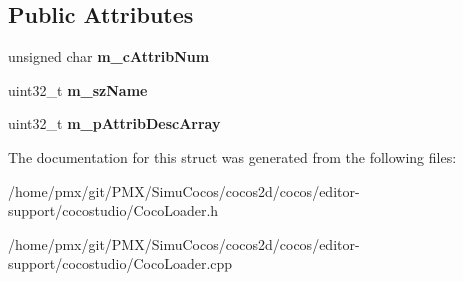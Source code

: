\subsection*{Public Attributes}
\begin{DoxyCompactItemize}
\item 
\mbox{\label{structcocostudio_1_1stExpCocoObjectDesc_af6dedd001344b6002b43b1380414cc0a}} 
unsigned char {\bfseries m\+\_\+c\+Attrib\+Num}
\item 
\mbox{\label{structcocostudio_1_1stExpCocoObjectDesc_a1d7d54a44a2aaad55befc59e32921082}} 
uint32\+\_\+t {\bfseries m\+\_\+sz\+Name}
\item 
\mbox{\label{structcocostudio_1_1stExpCocoObjectDesc_a9a1c251ffc6fba95077d15299bd07719}} 
uint32\+\_\+t {\bfseries m\+\_\+p\+Attrib\+Desc\+Array}
\end{DoxyCompactItemize}


The documentation for this struct was generated from the following files\+:\begin{DoxyCompactItemize}
\item 
/home/pmx/git/\+P\+M\+X/\+Simu\+Cocos/cocos2d/cocos/editor-\/support/cocostudio/Coco\+Loader.\+h\item 
/home/pmx/git/\+P\+M\+X/\+Simu\+Cocos/cocos2d/cocos/editor-\/support/cocostudio/Coco\+Loader.\+cpp\end{DoxyCompactItemize}
